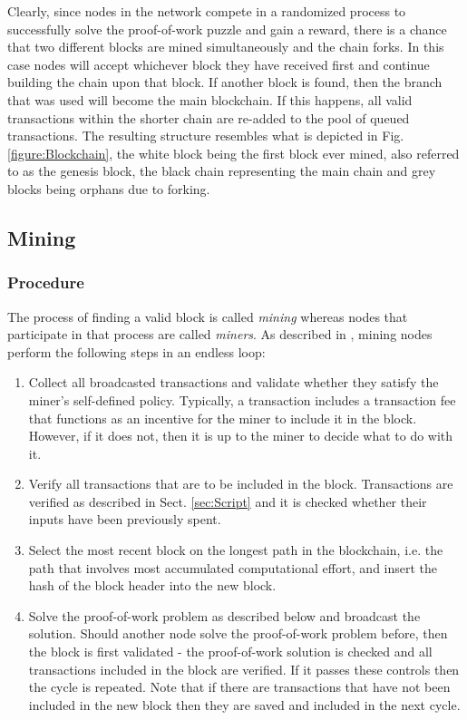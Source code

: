 \noindent
Clearly, since nodes in the network compete in a randomized process to successfully solve the proof-of-work puzzle and gain a reward, there is a chance that two different blocks are mined simultaneously and the chain forks. In this case nodes will accept whichever block they have received first and continue building the chain upon that block. If another block is found, then the branch that was used will become the main blockchain. If this happens, all valid transactions within the shorter chain are re-added to the pool of queued transactions. The resulting structure resembles what is depicted in Fig. \ref{figure:Blockchain}, the white block being the first block ever mined, also referred to as the genesis block, the black chain representing the main chain and grey blocks being orphans due to forking.

\subsection{Mining} \label{sec:Mining}

\subsubsection*{Procedure}
The process of finding a valid block is called \emph{mining} whereas nodes that participate in that process are called \emph{miners}. As described in \cite{Clark_BitcoinInternals}, mining nodes perform the following steps in an endless loop:

\begin{enumerate}[label=\arabic*), leftmargin=1cm]
\item Collect all broadcasted transactions and validate whether they satisfy the miner's self-defined policy. Typically, a transaction includes a transaction fee that functions as an incentive for the miner to include it in the block. However, if it does not, then it is up to the miner to decide what to do with it.
\item Verify all transactions that are to be included in the block. Transactions are verified as described in Sect. \ref{sec:Script} and it is checked whether their inputs have been previously spent.
\item Select the most recent block on the longest path in the blockchain, i.e. the path that involves most accumulated computational effort, and insert the hash of the block header into the new block.
\item Solve the proof-of-work problem as described below and broadcast the solution. Should another node solve the proof-of-work problem before, then the block is first validated - the proof-of-work solution is checked and all transactions included in the block are verified. If it passes these controls then the cycle is repeated. Note that if there are transactions that have not been included in the new block then they are saved and included in the next cycle.
\end{enumerate}


